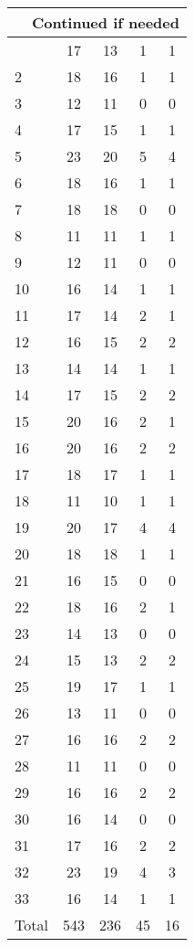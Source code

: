 \begin{center}
\begin{longtable}{l|c|c|c|c}
\hline \multicolumn{5}{|r|}{{Continued if needed}} \\ \hline
\endfoot 
1 & 17 & 13 & 1 & 1\\ \hline
2 & 18 & 16 & 1 & 1\\ \hline
3 & 12 & 11 & 0 & 0\\ \hline
4 & 17 & 15 & 1 & 1\\ \hline
5 & 23 & 20 & 5 & 4\\ \hline
6 & 18 & 16 & 1 & 1\\ \hline
7 & 18 & 18 & 0 & 0\\ \hline
8 & 11 & 11 & 1 & 1\\ \hline
9 & 12 & 11 & 0 & 0\\ \hline
10 & 16 & 14 & 1 & 1\\ \hline
11 & 17 & 14 & 2 & 1\\ \hline
12 & 16 & 15 & 2 & 2\\ \hline
13 & 14 & 14 & 1 & 1\\ \hline
14 & 17 & 15 & 2 & 2\\ \hline
15 & 20 & 16 & 2 & 1\\ \hline
16 & 20 & 16 & 2 & 2\\ \hline
17 & 18 & 17 & 1 & 1\\ \hline
18 & 11 & 10 & 1 & 1\\ \hline
19 & 20 & 17 & 4 & 4\\ \hline
20 & 18 & 18 & 1 & 1\\ \hline
21 & 16 & 15 & 0 & 0\\ \hline
22 & 18 & 16 & 2 & 1\\ \hline
23 & 14 & 13 & 0 & 0\\ \hline
24 & 15 & 13 & 2 & 2\\ \hline
25 & 19 & 17 & 1 & 1\\ \hline
26 & 13 & 11 & 0 & 0\\ \hline
27 & 16 & 16 & 2 & 2\\ \hline
28 & 11 & 11 & 0 & 0\\ \hline
29 & 16 & 16 & 2 & 2\\ \hline
30 & 16 & 14 & 0 & 0\\ \hline
31 & 17 & 16 & 2 & 2\\ \hline
32 & 23 & 19 & 4 & 3\\ \hline
33 & 16 & 14 & 1 & 1\\ \hline
\hline \hline
Total & 543 & 236 & 45 & 16




\end{longtable}
\end{center}

